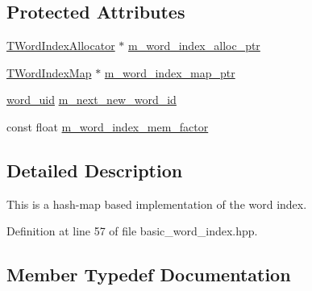 \subsection*{Protected Attributes}
\begin{DoxyCompactItemize}
\item 
\hyperlink{classuva_1_1smt_1_1bpbd_1_1server_1_1lm_1_1dictionary_1_1basic__word__index_a7dcfe947b277f05987cf55dfbd1fd021}{T\+Word\+Index\+Allocator} $\ast$ \hyperlink{classuva_1_1smt_1_1bpbd_1_1server_1_1lm_1_1dictionary_1_1basic__word__index_acbd75f75b5ba0115573b24273e901e03}{m\+\_\+word\+\_\+index\+\_\+alloc\+\_\+ptr}
\item 
\hyperlink{classuva_1_1smt_1_1bpbd_1_1server_1_1lm_1_1dictionary_1_1basic__word__index_ab58bffa80202cb71ba13ba19814b622c}{T\+Word\+Index\+Map} $\ast$ \hyperlink{classuva_1_1smt_1_1bpbd_1_1server_1_1lm_1_1dictionary_1_1basic__word__index_afc879e3d774df5b009385c5e6f466438}{m\+\_\+word\+\_\+index\+\_\+map\+\_\+ptr}
\item 
\hyperlink{namespaceuva_1_1smt_1_1bpbd_1_1server_a6bfe45ba344d65a7fdd7d26156328ddc}{word\+\_\+uid} \hyperlink{classuva_1_1smt_1_1bpbd_1_1server_1_1lm_1_1dictionary_1_1basic__word__index_a9ca20f562bff53f7596e15d0f884e0c8}{m\+\_\+next\+\_\+new\+\_\+word\+\_\+id}
\item 
const float \hyperlink{classuva_1_1smt_1_1bpbd_1_1server_1_1lm_1_1dictionary_1_1basic__word__index_aa1c113ede28b36600842da1f8a4652f5}{m\+\_\+word\+\_\+index\+\_\+mem\+\_\+factor}
\end{DoxyCompactItemize}


\subsection{Detailed Description}
This is a hash-\/map based implementation of the word index. 

Definition at line 57 of file basic\+\_\+word\+\_\+index.\+hpp.



\subsection{Member Typedef Documentation}
\hypertarget{classuva_1_1smt_1_1bpbd_1_1server_1_1lm_1_1dictionary_1_1basic__word__index_a7dcfe947b277f05987cf55dfbd1fd021}{}
